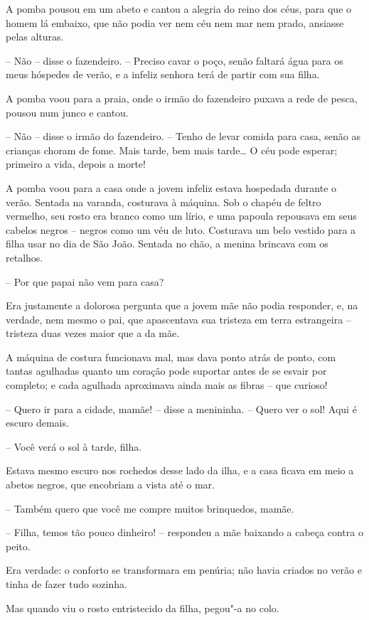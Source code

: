 A pomba pousou em um abeto e cantou a alegria do reino dos céus, para
que o homem lá embaixo, que não podia ver nem céu nem mar nem prado,
ansiasse pelas alturas.

-- Não -- disse o fazendeiro. -- Preciso cavar o poço, senão faltará água
para os meus hóspedes de verão, e a infeliz senhora terá de partir com
sua filha. 

A pomba voou para a praia, onde o irmão do fazendeiro puxava a rede de
pesca, pousou num junco e cantou.

-- Não -- disse o irmão do fazendeiro. -- Tenho de levar comida para casa,
senão as crianças choram de fome.  Mais tarde, bem mais tarde\ldots{} O céu
pode esperar; primeiro a vida, depois a morte!

A pomba voou para a casa onde a jovem infeliz estava hospedada durante o
verão. Sentada na varanda, costurava à máquina. Sob o chapéu de feltro
vermelho, seu rosto era branco como um lírio, e uma papoula repousava em seus cabelos negros 
-- negros como um véu de luto.
Costurava um belo vestido para a filha usar no dia de São João. Sentada
no chão, a menina brincava com os retalhos.

-- Por que papai não vem para casa? 

Era justamente a dolorosa pergunta que a jovem mãe não podia responder,
e, na verdade, nem mesmo o pai, que apascentava sua tristeza em terra
estrangeira -- tristeza duas vezes maior que a da mãe.  

 A máquina de costura funcionava mal, mas dava ponto atrás de ponto, com
tantas agulhadas quanto um coração pode suportar antes de se esvair por
completo; e cada agulhada aproximava ainda mais as fibras -- que curioso! 

-- Quero ir para a cidade, mamãe! -- disse a menininha. -- Quero ver o sol!
Aqui é escuro demais.

-- Você verá o sol à tarde, filha.

Estava mesmo escuro nos rochedos desse lado da ilha, e a casa ficava em
meio a abetos negros, que encobriam a vista até o mar.

-- Também quero que você me compre muitos brinquedos, mamãe.

-- Filha, temos tão pouco dinheiro! -- respondeu a mãe baixando a cabeça
contra o peito.

Era verdade: o conforto se transformara em penúria; 
não havia criados no verão e tinha de fazer tudo sozinha. 

Mas quando viu o rosto entristecido da filha, pegou"-a no colo.


